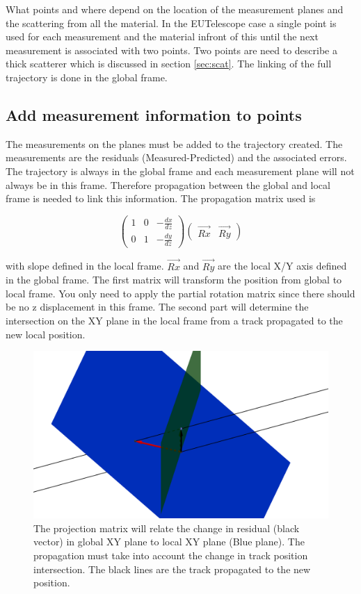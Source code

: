 What points and where depend on the location of the measurement planes and the scattering from all the material. In the EUTelescope case a single point is used for each measurement and the material infront of this until the next measurement is associated with two points. Two points are need to describe a thick scatterer which is discussed in section \ref{sec:scat}. The linking of the full trajectory is done in the global frame.

\subsection{Add measurement information to points}

The measurements on the planes must be added to the trajectory created. The measurements are the residuals (Measured-Predicted) and the associated errors. The trajectory is always in the global frame and each measurement plane will not always be in this frame. Therefore propagation between the global and local frame is needed to link this information.
The propagation matrix used is

\[ 
\left( \begin{array}{ccc}
1  & 0   & -\frac{dx}{dz}   \\
0   & 1  & -\frac{dy}{dz}  
  \label{eq:prop}
\end{array}
 \right)
  \left( \begin{array}{cc}
 \overrightarrow{Rx}  &  \overrightarrow{Ry}  
\end{array}
 \right)
 \] 
 
 with slope defined in the local frame.  $\overrightarrow{Rx}$ and  $\overrightarrow{Ry}$ are the local X/Y axis defined in the global frame. The first matrix will transform the position from global to local frame. You only need to apply the partial rotation matrix since there should be no z displacement in this frame. The second part will determine the intersection on the XY plane in the local frame from a track propagated to the new local position.
 
 \begin{figure}[H]
\centering
\includegraphics[width=1.0\linewidth]{figures/prop.png}
\caption{The projection matrix will relate the change in residual (black vector) in global XY plane to local XY plane (Blue plane). The propagation must take into account the change in track position intersection. The black lines are the track propagated to the new position.}
\label{fig:Prop}
\end{figure}
 
